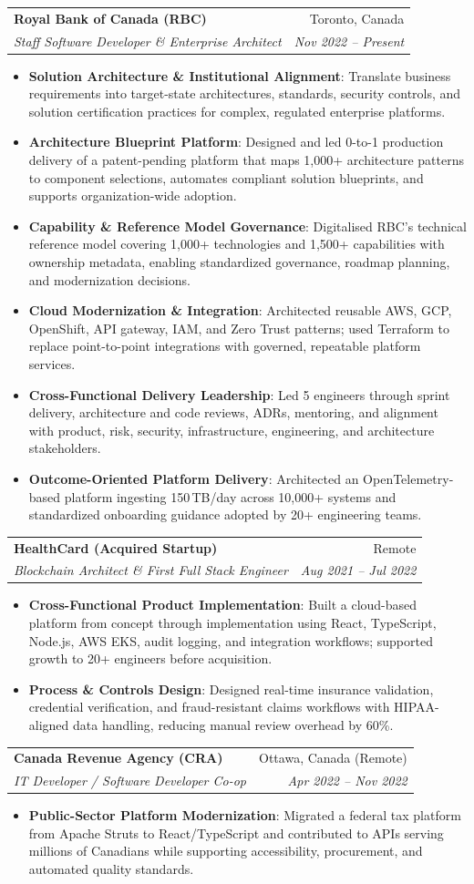 \documentclass[letterpaper,9.5pt]{article}
\makeatletter
\newcommand{\resumeItem}[2]{\item\small{\textbf{#1}{: #2 \vspace{-2pt}}}}
\newcommand{\resumeSubheading}[4]{\vspace{-2pt}\item\begin{tabular*}{0.97\textwidth}{l@{\extracolsep{\fill}}r}\textbf{#1} & #2 \\\textit{\small#3} & \textit{\small #4} \\\end{tabular*}\vspace{-6pt}}
\newcommand{\resumeItemListStart}{\begin{itemize}}
\newcommand{\resumeItemListEnd}{\end{itemize}\vspace{-6pt}}
\makeatother
\begin{document}
  \resumeSubheading
    {Royal Bank of Canada (RBC)}{Toronto, Canada}
    {Staff Software Developer \& Enterprise Architect}{Nov 2022 -- Present}
  \resumeItemListStart
    \resumeItem{Solution Architecture \& Institutional Alignment}
      {Translate business requirements into target-state architectures, standards, security controls, and solution certification practices for complex, regulated enterprise platforms.}
    \resumeItem{Architecture Blueprint Platform}
      {Designed and led 0-to-1 production delivery of a patent-pending platform that maps 1,000+ architecture patterns to component selections, automates compliant solution blueprints, and supports organization-wide adoption.}
    \resumeItem{Capability \& Reference Model Governance}
      {Digitalised RBC's technical reference model covering 1,000+ technologies and 1,500+ capabilities with ownership metadata, enabling standardized governance, roadmap planning, and modernization decisions.}
    \resumeItem{Cloud Modernization \& Integration}
      {Architected reusable AWS, GCP, OpenShift, API gateway, IAM, and Zero Trust patterns; used Terraform to replace point-to-point integrations with governed, repeatable platform services.}
    \resumeItem{Cross-Functional Delivery Leadership}
      {Led 5 engineers through sprint delivery, architecture and code reviews, ADRs, mentoring, and alignment with product, risk, security, infrastructure, engineering, and architecture stakeholders.}
    \resumeItem{Outcome-Oriented Platform Delivery}
      {Architected an OpenTelemetry-based platform ingesting 150\,TB/day across 10,000+ systems and standardized onboarding guidance adopted by 20+ engineering teams.}
  \resumeItemListEnd

  \resumeSubheading
    {HealthCard (Acquired Startup)}{Remote}
    {Blockchain Architect \& First Full Stack Engineer}{Aug 2021 -- Jul 2022}
  \resumeItemListStart
    \resumeItem{Cross-Functional Product Implementation}
      {Built a cloud-based platform from concept through implementation using React, TypeScript, Node.js, AWS EKS, audit logging, and integration workflows; supported growth to 20+ engineers before acquisition.}
    \resumeItem{Process \& Controls Design}
      {Designed real-time insurance validation, credential verification, and fraud-resistant claims workflows with HIPAA-aligned data handling, reducing manual review overhead by 60\%.}
  \resumeItemListEnd

  \resumeSubheading
    {Canada Revenue Agency (CRA)}{Ottawa, Canada (Remote)}
    {IT Developer / Software Developer Co-op}{Apr 2022 -- Nov 2022}
  \resumeItemListStart
    \resumeItem{Public-Sector Platform Modernization}
      {Migrated a federal tax platform from Apache Struts to React/TypeScript and contributed to APIs serving millions of Canadians while supporting accessibility, procurement, and automated quality standards.}
  \resumeItemListEnd
\end{document}
